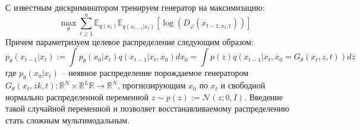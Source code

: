 \documentclass{article}
\begin{document}
С известным дискриминатором тренируем генератор на максимизацию:
 \begin{equation}
	\max\limits_\theta\sum\limits_{t\geqslant 1}^n \mathbb{E}_{q(x_t)}\mathbb{E}_{q(x_{t-1}|x_t)}[\log{(D_\varphi(x_{t-1, x_t, t}))}]
\end{equation}
Причем параметризуем целевое распределение следующим образом:
 \begin{equation}
	p_\theta(x_{t-1}|x_t) := \int p_\theta(x_0|x_t)q(x_{t-1}|x_t, x_0)dx_0 =\int p(z)q(x_{t-1}|x_t, x_0 = G_\theta(x_t, z, t))dz
\end{equation}
где $p_\theta(x_0|x_t)$ -- неявное распределение порождаемое генератором $G_\theta(x_t, zk, t):\mathbb{R}^N\times\mathbb{R}^L\mathbb{R}\to \mathbb{R}^N$, прогнозирующим $x_0$ по $x_t$ и свободной нормально распределенной переменной $z\sim p(z) := \mathcal{N}(z; 0, I)$. Введение такой случайной переменной и позволяет восстанавливаемому распределению стать сложным мультимодальным.



\end{document}
